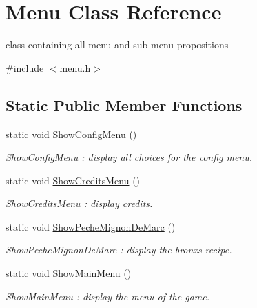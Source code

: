 \hypertarget{class_menu}{}\section{Menu Class Reference}
\label{class_menu}


class containing all menu and sub-\/menu propositions  




{\ttfamily \#include $<$menu.\+h$>$}

\subsection*{Static Public Member Functions}
\begin{DoxyCompactItemize}
\item 
\mbox{\label{class_menu_a7b65fea12b8d3721858630adb755e2a4}} 
static void \hyperlink{class_menu_a7b65fea12b8d3721858630adb755e2a4}{Show\+Config\+Menu} ()
\begin{DoxyCompactList}\small\item\em Show\+Config\+Menu \+: display all choices for the config menu. \end{DoxyCompactList}\item 
\mbox{\label{class_menu_ac14391d8c4eac7bd821aaf3922d5870d}} 
static void \hyperlink{class_menu_ac14391d8c4eac7bd821aaf3922d5870d}{Show\+Credits\+Menu} ()
\begin{DoxyCompactList}\small\item\em Show\+Credits\+Menu \+: display credits. \end{DoxyCompactList}\item 
\mbox{\label{class_menu_a65b4f7b728c68a50ffcb74c6537e5a77}} 
static void \hyperlink{class_menu_a65b4f7b728c68a50ffcb74c6537e5a77}{Show\+Peche\+Mignon\+De\+Marc} ()
\begin{DoxyCompactList}\small\item\em Show\+Peche\+Mignon\+De\+Marc \+: display the bronx\textquotesingle{}s recipe. \end{DoxyCompactList}\item 
\mbox{\label{class_menu_ae72c5741a752093dfe5a76dde903d1dd}} 
static void \hyperlink{class_menu_ae72c5741a752093dfe5a76dde903d1dd}{Show\+Main\+Menu} ()
\begin{DoxyCompactList}\small\item\em Show\+Main\+Menu \+: display the menu of the game. \end{DoxyCompactList}\end{DoxyCompactItemize}



